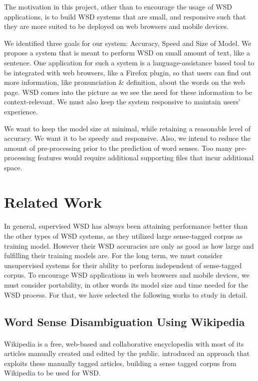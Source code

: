 \documentclass[a4paper,12pt]{nurop}
\begin{document}
The motivation in this project, other than to encourage the usage of WSD applications, is to build WSD systems that are small, and responsive such that they are more suited to be deployed on web browsers and mobile devices.

We identified three goals for our system: Accuracy, Speed and Size of Model. We propose a system that is meant to perform WSD on small amount of text, like a sentence. One application for such a system is a language-assistance based tool to be integrated with web browsers, like a Firefox plugin, so that users can find out more information, like pronunciation \& definition, about the words on the web page. WSD comes into the picture as we see the need for these information to be context-relevant. We must also keep the system responsive to maintain users' experience.

We want to keep the model size at minimal, while retaining a reasonable level of accuracy. We want it to be speedy and responsive. Also, we intend to reduce the amount of pre-processing prior to the prediction of word senses. Too many pre-processing features would require additional supporting files that incur additional space.

\section{Related Work}
\label{ch:related}
\paragraph{}
In general, supervised WSD has always been attaining performance better than the other types of WSD systems, as they utilized large sense-tagged corpus as training model. However their WSD accuracies are only as good as how large and fulfilling their training models are. For the long term, we must consider unsupervised systems for their ability to perform independent of sense-tagged corpus. To encourage WSD applications in web browsers and mobile devices, we must consider portability, in other words its model size and time needed for the WSD process. For that, we have selected the following works to study in detail.

\subsection{Word Sense Disambiguation Using Wikipedia}
\paragraph{}
Wikipedia is a free, web-based and collaborative encyclopedia with most of its articles manually created and edited by the public. \cite{wikipedia} introduced an approach that exploits these manually tagged articles, building a sense tagged corpus from Wikipedia to be used for WSD.
\end{document}
